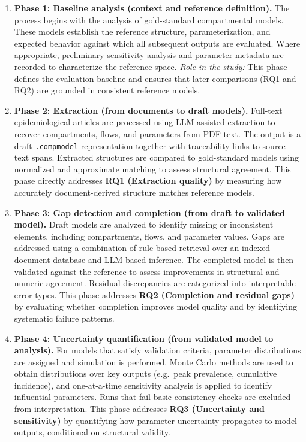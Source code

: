 \documentclass[a4paper,12pt]{article}
\begin{document}
\begin{enumerate}[leftmargin=*]

\item \textbf{Phase 1: Baseline analysis (context and reference definition).}
The process begins with the analysis of gold-standard compartmental models. These models establish the reference structure, parameterization, and expected behavior against which all subsequent outputs are evaluated. Where appropriate, preliminary sensitivity analysis and parameter metadata are recorded to characterize the reference space.
\emph{Role in the study:} This phase defines the evaluation baseline and ensures that later comparisons (RQ1 and RQ2) are grounded in consistent reference models.

\item \textbf{Phase 2: Extraction (from documents to draft models).}
Full-text epidemiological articles are processed using LLM-assisted extraction to recover compartments, flows, and parameters from PDF text. The output is a draft \texttt{.compmodel} representation together with traceability links to source text spans. Extracted structures are compared to gold-standard models using normalized and approximate matching to assess structural agreement. This phase directly addresses \textbf{RQ1 (Extraction quality)} by measuring how accurately document-derived structure matches reference models.

\item \textbf{Phase 3: Gap detection and completion (from draft to validated model).}
Draft models are analyzed to identify missing or inconsistent elements, including compartments, flows, and parameter values. Gaps are addressed using a combination of rule-based retrieval over an indexed document database and LLM-based inference. The completed model is then validated against the reference to assess improvements in structural and numeric agreement. Residual discrepancies are categorized into interpretable error types. This phase addresses \textbf{RQ2 (Completion and residual gaps)} by evaluating whether completion improves model quality and by identifying systematic failure patterns.

\item \textbf{Phase 4: Uncertainty quantification (from validated model to analysis).}
For models that satisfy validation criteria, parameter distributions are assigned and simulation is performed. Monte Carlo methods are used to obtain distributions over key outputs (e.g.\ peak prevalence, cumulative incidence), and one-at-a-time sensitivity analysis is applied to identify influential parameters. Runs that fail basic consistency checks are excluded from interpretation. This phase addresses \textbf{RQ3 (Uncertainty and sensitivity)} by quantifying how parameter uncertainty propagates to model outputs, conditional on structural validity.

\end{enumerate}
\end{document}
